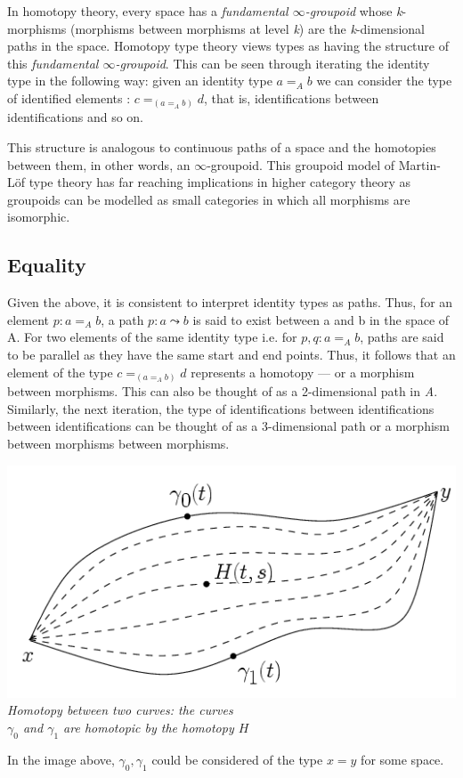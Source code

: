 \documentclass[12pt]{report}
\begin{document}
In homotopy theory, every space has a \textit{fundamental $\infty$-groupoid} whose \textit{k}-morphisms (morphisms between morphisms at level \textit{k}) are the \textit{k}-dimensional paths in the space. Homotopy type theory views types as having the structure of this \textit{fundamental $\infty$-groupoid}. This can be seen through iterating the identity type in the following way: given an identity type $a =_A b$ we can consider the type of identified elements : $c =_{(a =_A b)} d$, that is, identifications between identifications and so on.

This structure is analogous to continuous paths of a space and the homotopies between them, in other words, an $\infty$-groupoid. This groupoid model of Martin-L\"of type theory has far reaching implications in higher category theory as groupoids can be modelled as small categories in which all morphisms are isomorphic.

\subsection{Equality}
Given the above, it is consistent to interpret identity types as paths. Thus, for an element $p : a =_A b$, a path $ p : a \leadsto b $ is said to exist between a and b in the space of A. For two elements of the same identity type i.e. for $p,q : a =_A b$, paths are said to be parallel as they have the same start and end points. Thus, it follows that an element of the type $c =_{(a =_A b)} d$ represents a homotopy --- or a morphism between morphisms. This can also be thought of as a 2-dimensional path in \textit{A}. Similarly, the next iteration, the type of identifications between identifications between identifications can be thought of as a 3-dimensional path or a morphism between morphisms between morphisms.
\begin{center}
\includegraphics[scale=0.5]{./2.png}\\
\small{\textit{Homotopy between two curves: the curves\\ $\gamma_0$ and $ \gamma_1$ are homotopic by the homotopy $H$}}
\end{center}
In the image above, $\gamma_0, \gamma_1$ could be considered of the type $x = y$ for some space.
\end{document}
